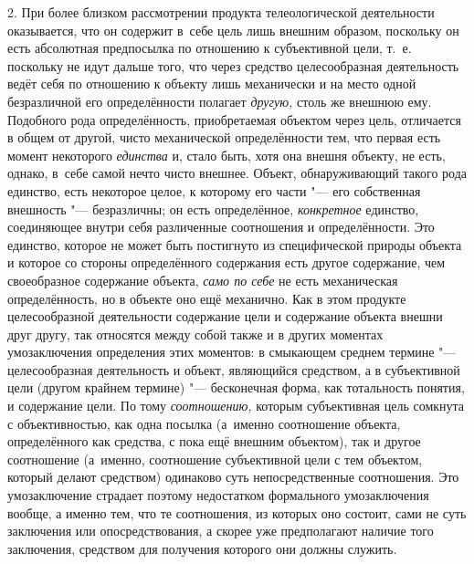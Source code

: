 2. При более близком рассмотрении продукта телеологической
деятельности оказывается, что он содержит в~себе цель лишь внешним образом,
поскольку он есть абсолютная предпосылка по отношению к субъективной цели,
т.~е. поскольку не идут дальше того, что через средство целесообразная
деятельность ведёт себя по отношению к объекту лишь механически и на место
одной безразличной его определённости полагает {\em другую,} столь же
внешнюю ему. Подобного рода определённость, приобретаемая объектом через
цель, отличается в общем от другой, чисто механической
определённости тем, что первая есть момент некоторого
{\em единства} и, стало
быть, хотя она внешня объекту, не есть, однако, в~себе самой нечто чисто
внешнее. Объект, обнаруживающий такого рода единство, есть некоторое целое,
к которому его части "--- его собственная внешность
"--- безразличны; он есть определённое,
{\em конкретное}
единство, соединяющее внутри себя различенные соотношения и
определённости. Это единство, которое не может быть постигнуто из
специфической природы объекта и которое со стороны определённого содержания
есть другое содержание, чем своеобразное содержание объекта,
{\em само по себе} не
есть механическая определённость, но в объекте оно ещё механично. Как в
этом продукте целесообразной деятельности содержание цели и содержание
объекта внешни друг другу, так относятся между собой также и в других
моментах умозаключения определения этих моментов: в смыкающем среднем
термине "--- целесообразная деятельность и объект, являющийся
средством, а в субъективной цели (другом крайнем термине)
"--- бесконечная форма, как тотальность понятия, и содержание
цели. По тому {\em соотношению,}
которым субъективная цель сомкнута с объективностью, как одна
посылка (а~именно соотношение объекта, определённого как средства, с пока
ещё внешним объектом), так и другое соотношение (а~именно, соотношение
субъективной цели с тем объектом, который делают средством) одинаково суть
непосредственные соотношения. Это умозаключение страдает поэтому
недостатком формального умозаключения вообще, а именно тем, что те
соотношения, из которых оно состоит, сами не суть заключения или
опосредствования, а скорее уже предполагают наличие того заключения,
средством для получения которого они должны служить.

